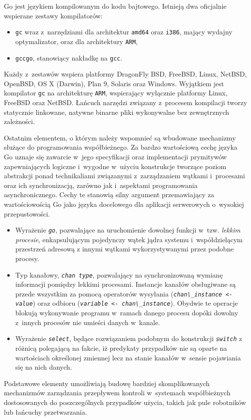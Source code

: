 \par{
  Go jest językiem kompilowanym do kodu bajtowego. Istnieją dwa oficjalnie wspierane zestawy kompilatorów:
  \begin{itemize}
    \item \texttt{gc} wraz z~narzędziami dla architektur \texttt{amd64} oraz \texttt{i386}, mający wydajny optymalizator, oraz dla architektury \texttt{ARM},
    \item \texttt{gccgo}, stanowiący nakładkę na \texttt{gcc}.
  \end{itemize}
  Każdy z~zestawów wspiera platformy DragonFly BSD, FreeBSD, Linux, NetBSD, OpenBSD, OS X (Darwin), Plan 9, Solaris oraz Windows. Wyjątkiem jest kompilator \texttt{gc} na architekturę \texttt{ARM}, wspierający wyłącznie platformy Linux, FreeBSD oraz NetBSD. \cite{godoc:compilers}
  Łańcuch narzędzi związany z~procesem kompilacji tworzy statycznie linkowane, natywne binarne pliki wykonywalne bez zewnętrznych zależności.
}

\par{
  Ostatnim elementem, o którym należy wspomnieć są wbudowane mechanizmy służące do programowania współbieżnego.
  Za bardzo wartościową cechę języka Go uznaje się zawarcie w~jego specyfikacji oraz implementacji prymitywów zapewniających logiczne i~wygodne w~użyciu konstrukcje tworzące poziom abstrakcji ponad technikaliami związanymi z~zarządzaniem wątkami i~procesami oraz ich synchronizacją, zarówno jak i~aspektami programowania asynchronicznego.
  Cechy te stanowią silny argument przemawiający za wartościowością Go jako języka docelowego dla aplikacji serwerowych o~wysokiej przepustowości.
  \begin{itemize}
    \item Wyrażenie \textit{\lstinline{go}}, pozwalające na uruchomienie dowolnej funkcji w~tzw. \emph{lekkim procesie}, enkapsulującym pojedynczy wątek jądra systemu i~współdzielącym przestrzeń adresową z innymi wątkami wykorzystywanymi przez podobne procesy.
    \item Typ kanałowy, \textit{\lstinline{chan type}}, pozwalający na synchronizowaną wymianę informacji pomiędzy lekkimi procesami. Instancje kanałów obsługiwane są przede wszystkim za pomocą operatorów wysyłania (\textit{\lstinline{chan\_instance <- value}}) oraz odbioru (\textit{\lstinline{variable <- chan\_instance}}). Obydwie te operacje blokują wykonywanie programu w~ramach danego procesu dopóki dowolny z~innych procesów nie umieści danych w~kanale.
    \item Wyrażenie \textit{\lstinline{select}}, będące rozwiązaniem podobnym do konstrukcji \textit{\lstinline{switch}} z różnicą polegającą na fakcie, iż predykaty przypadków nie są oparte na wartościach określonej zmiennej lecz na stanie kanałów w~sensie pojawiania się na nich danych.
  \end{itemize}
  Podstawowe elementy umożliwiają budowę bardziej skomplikowanych mechanizmów zarządzania przepływem kontroli w~systemach współbieżnych dostosowanych do poszczególnych przypadków użycia, takich jak pule robotników lub łańcuchy przetwarzania.
}